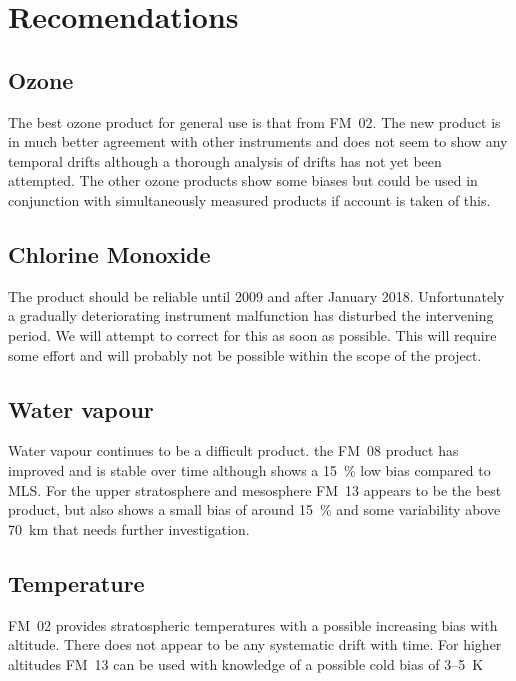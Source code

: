 \section{Recomendations}
\subsection{Ozone}
The best ozone product for general use is that from FM~02.  The new product is
in much better agreement with other instruments and does not seem to show any
temporal drifts although a thorough analysis of drifts has not yet been
attempted.  The other ozone products show some biases but could be used in
conjunction with simultaneously measured products if account is taken of this.

\subsection{Chlorine Monoxide}
The  product should be reliable until 2009 and after January 2018.
Unfortunately a gradually deteriorating instrument malfunction has disturbed
the intervening period.  We will attempt to correct for this as soon as
possible. This will require some effort and will probably not be possible within the scope of the project.

\subsection{Water vapour}
Water vapour continues to be a difficult product. the FM~08 product has
improved and is stable over time although shows a 15~\% low bias compared to
MLS.  For the upper stratosphere and mesosphere FM~13 appears to be the best
product, but also shows a small bias of around 15~\% and some variability above
70~km that needs further investigation.

\subsection{Temperature}
FM~02 provides stratospheric temperatures with a possible increasing bias with
altitude. There does not appear to be any systematic drift with time. For
higher altitudes FM~13 can be used with knowledge of a possible cold bias of
3--5~K

